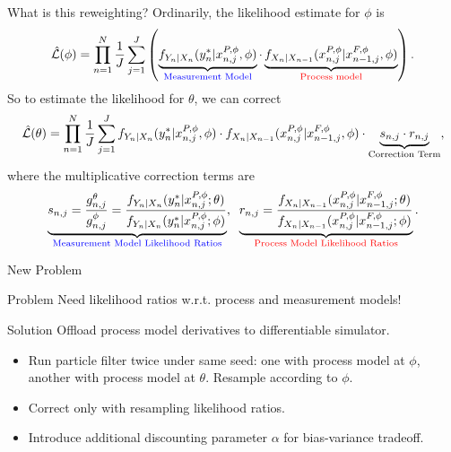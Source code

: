 \documentclass{beamer}
\begin{document}
\begin{frame}{What is this reweighting?}
    Ordinarily, the likelihood estimate for $\phi$ is 
    $$\hat{\mathcal{L}}(\phi) = \prod_{n=1}^N \frac{1}{J} \sum_{j=1}^J \left(\underbrace{f_{Y_n|X_n}(y_n^* | x_{n,j}^{P,\phi}, \phi)}_{\textcolor{blue}{\text{Measurement Model}}}
    \cdot 
    \underbrace{f_{X_n|X_{n-1}}(x_{n,j}^{P, \phi} | x_{n-1,j}^{F,\phi}, \phi)}_{\textcolor{red}{\text{Process model}}}\right).$$
    \pause
    So to estimate the likelihood for $\theta$, we can correct 
    $$
        \hat{\mathcal{L}}(\theta) 
        = \prod_{n=1}^N \frac{1}{J} \sum_{j=1}^J f_{Y_n|X_n}(y_n^* | x_{n,j}^{P,\phi}, \phi) \cdot 
        f_{X_n|X_{n-1}}(x_{n,j}^{P, \phi} | x_{n-1,j}^{F,\phi}, \phi) 
        \cdot \underbrace{s_{n,j} \cdot r_{n,j}}_{\text{Correction Term}},
    $$
    \pause
    where the multiplicative correction terms are
    $$
        \underbrace{s_{n,j}=\frac{g_{n,j}^\theta}{g_{n,j}^{\phi}}=\frac{f_{Y_n|X_n}(y_n^*|x_{n,j}^{P, \phi}; \theta)}{f_{Y_n|X_n}(y_n^*|x_{n,j}^{P,\phi}; \phi)}}_{\textcolor{blue}{\text{Measurement Model Likelihood Ratios}}},\;\; \underbrace{r_{n,j}=\frac{f_{X_n|X_{n-1}}(x_{n,j}^{P, \phi}|x_{n-1,j}^{F, \phi}; \theta)}{f_{X_n|X_{n-1}}(x_{n,j}^{P, \phi}|x_{n-1,j}^{F, \phi}; \phi)}}_{\textcolor{red}{\text{Process Model Likelihood Ratios}}}.
    $$
        
\end{frame}

\begin{frame}{New Problem}
    \begin{block}{Problem}
        Need likelihood ratios w.r.t. process and measurement models!
    \end{block}
    \pause 
    \begin{block}{Solution}
        Offload process model derivatives to differentiable simulator. 
    \end{block}
    \begin{itemize}
        \item \pause Run particle filter twice under same seed: one with process model at $\phi$, another with process model at $\theta$. Resample according to $\phi$.
        \item \pause Correct only with resampling likelihood ratios. 
        \item \pause Introduce additional discounting parameter $\alpha$ for bias-variance tradeoff.
    \end{itemize}
\end{frame}
\end{document}
